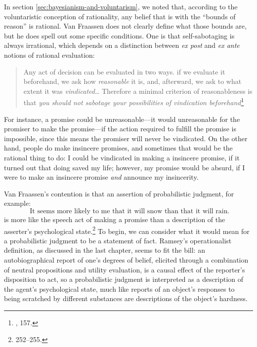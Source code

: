 In section \ref{sec:bayesianism-and-voluntarism}, we noted that, according to the voluntaristic conception of rationality,  any belief that is with the ``bounds of reason'' is rational. Van
Fraassen does not clearly define what those bounds are, but he does
spell out some specific conditions. One is that self-sabotaging is
always irrational, which depends on a distinction between \emph{ex post}
and \emph{ex ante} notions of rational evaluation:

\begin{quote}
Any act of decision can be evaluated in two ways. if we evaluate it
beforehand, we ask how \emph{reasonable} it is, and, afterward, we ask
to what extent it was \emph{vindicated}\ldots{} Therefore a minimal
criterion of reasonableness is that \emph{you should not sabotage your
possibilities of vindication beforehand}\footnote{\cite{bvflaws}, 157.}
\end{quote}

For instance, a promise could be unreasonable---it would unreasonable for the promiser to make the promise---if the action required to
fulfill the promise is impossible, since this means the promiser will
never be vindicated. On the other hand, people do make insincere
promises, and sometimes that would be the rational thing to do: I could
be vindicated in making a insincere promise, if it turned out that doing
saved my life; however, my promise would be absurd, if I were to make an
insincere promise \emph{and} announce my insincerity. 

Van Fraassen's contention is that an assertion of probabilistic judgment, for example:
\begin{equation}
	\text{ It seems more likely to me that it will snow than that it will rain.}
	\label{eq:vfassertion}
\end{equation}
is more like the speech act of making a promise than a description of
the asserter's psychological state.\footnote{\cite{beliefwill} 252--255.} To begin, we
can consider what it would mean for a probabilistic judgment to be a
statement of fact. Ramsey's operationalist definition, as discussed in
the last chapter, seems to fit the bill: an autobiographical report of
one's degrees of belief, elicited through a combination of neutral
propositions and utility evaluation, is a causal effect of the
reporter's disposition to act, so a probabilistic judgment is
interpreted as a description of the agent's psychological state, much
like reports of an object's responses to being scratched by different
substances are descriptions of the object's hardness.

